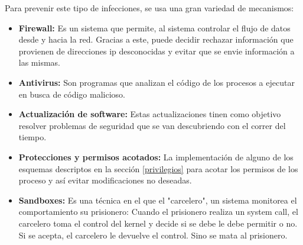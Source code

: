 Para prevenir este tipo de infecciones, se usa una gran variedad de mecanismos:
\begin{itemize}
	\item \textbf{Firewall:} Es un sistema que permite, al sistema controlar el flujo de datos desde y hacia la red. Gracias a este, puede decidir rechazar información que provienen de direcciones ip desconocidas y evitar que se envie información a las mismas.
	\item \textbf{Antivirus:} Son programas que analizan el código de los procesos a ejecutar en busca de código malicioso.
	\item \textbf{Actualización de software:} Estas actualizaciones tinen como objetivo resolver problemas de seguridad que se van descubriendo con el correr del tiempo.
	\item \textbf{Protecciones y permisos acotados:} La implementación de alguno de los esquemas descriptos en la sección \ref{privilegios} para acotar los permisos de los proceso y así evitar modificaciones no deseadas.
	\item\textbf{Sandboxes:} Es una técnica en el que el "carcelero", un sistema monitorea el comportamiento su prisionero: Cuando el prisionero realiza un system call, el carcelero toma el control del kernel y decide si se debe le debe permitir o no. Si se acepta, el carcelero le devuelve el control. Sino se mata al prisionero.
\end{itemize}